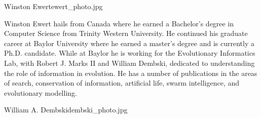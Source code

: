 \begin{authorbio}{Winston Ewert}{ewert_photo.jpg}

Winston Ewert hails from Canada where he earned a Bachelor's degree in Computer Science from Trinity Western University. He continued his graduate career at Baylor University where he earned a master's degree and is currently a Ph.D. candidate. While at Baylor he is working for the Evolutionary Informatics Lab, with Robert J. Marks II and William Dembski, dedicated to understanding the role of information in evolution. He has a number of publications in the areas of search, conservation of information, artificial life, swarm intelligence, and evolutionary modelling. 
\end{authorbio}

\begin{authorbio}{William A. Dembski}{dembski_photo.jpg}


\end{authorbio}
